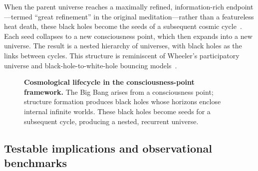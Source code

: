 \documentclass[11pt,a4paper]{article}
\theoremstyle{plain}
\begin{document}
When the parent universe reaches a maximally refined, information-rich endpoint---termed ``great refinement'' in the original meditation---rather than a featureless heat death, these black holes become the seeds of a subsequent cosmic cycle~\cite{penrose2010}. Each seed collapses to a new consciousness point, which then expands into a new universe. The result is a nested hierarchy of universes, with black holes as the links between cycles. This structure is reminiscent of Wheeler's participatory universe and black-hole-to-white-hole bouncing models~\cite{wheeler1990}.

\begin{figure}[htbp]
\centering
{}
\caption{\textbf{Cosmological lifecycle in the consciousness-point framework.} The Big Bang arises from a consciousness point; structure formation produces black holes whose horizons enclose internal infinite worlds. These black holes become seeds for a subsequent cycle, producing a nested, recurrent universe.}
\label{fig:cosmo}
\end{figure}

\subsection{Testable implications and observational benchmarks}
\end{document}

